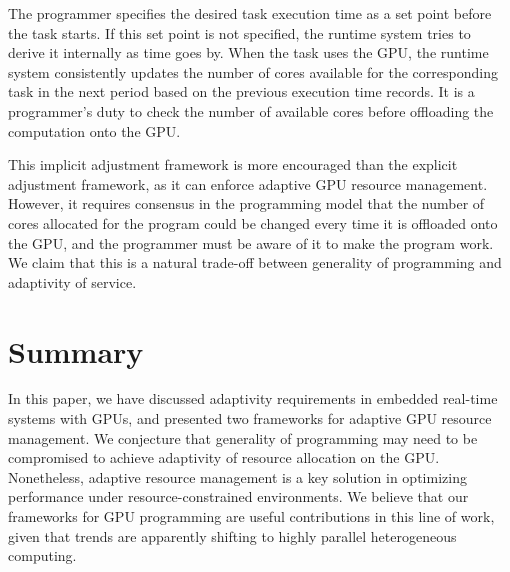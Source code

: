 \documentclass[times, 10pt, twocolumn]{article}
\begin{document}
The programmer specifies the desired task execution time as a set point
before the task starts.
If this set point is not specified, the runtime system tries to derive
it internally as time goes by.
When the task uses the GPU, the runtime system consistently updates the
number of cores available for the corresponding task in the next period
based on the previous execution time records.
It is a programmer's duty to check the number of available cores before
offloading the computation onto the GPU.

This implicit adjustment framework is more encouraged than the explicit
adjustment framework, as it can enforce adaptive GPU resource
management.
However, it requires consensus in the programming model that the number
of cores allocated for the program could be changed every time it is
offloaded onto the GPU, and the programmer must be aware of it to make
the program work.
We claim that this is a natural trade-off between generality of
programming and adaptivity of service.

\section{Summary}
\label{sec:summary}

In this paper, we have discussed adaptivity requirements in embedded
real-time systems with GPUs, and presented two frameworks for adaptive
GPU resource management.
We conjecture that generality of programming may need to be compromised
to achieve adaptivity of resource allocation on the GPU.
Nonetheless, adaptive resource management is a key solution in
optimizing performance under resource-constrained environments.
We believe that our frameworks for GPU programming are useful
contributions in this line of work, given that trends are apparently
shifting to highly parallel heterogeneous computing.


{\footnotesize

}
\end{document}
